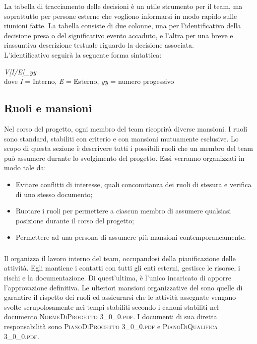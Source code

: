 			La tabella di tracciamento delle decisioni è un utile strumento per il team, ma soprattutto per persone esterne che vogliono informarsi in modo rapido sulle riunioni fatte.
			La tabella consiste di due colonne, una per l'identificativo della decisione presa o del significativo evento accaduto, e l'altra per una breve e riassuntiva descrizione testuale riguardo la decisione associata.\\
			L'identificativo seguirà la seguente forma sintattica:
			\begin{center}
				\textit{V[I/E]\_yy} \\\vspace{0.2cm}dove \textit{I} = Interno, \textit{E} = Esterno, \textit{yy} = numero progessivo
			\end{center}
	
	\newpage	
	\subsection{Ruoli e mansioni}
	Nel corso del progetto, ogni membro del team ricoprirà diverse mansioni. I ruoli sono standard, stabiliti con criterio e con mansioni mutuamente esclusive. Lo scopo di questa sezione è descrivere tutti i possibili ruoli che un membro del team può assumere durante lo svolgimento del progetto. Essi verranno organizzati in modo tale da:
	\begin{itemize}
		\item Evitare conflitti di interesse, quali concomitanza dei ruoli di stesura e verifica di uno stesso documento;
		\item Ruotare i ruoli per permettere a ciascun membro di assumere qualsiasi posizione durante il corso del progetto;
		\item Permettere ad una persona di assumere più mansioni contemporaneamente.
	\end{itemize}

		\subsubsection{\RdP}
		Il \textit{\RdP} organizza il lavoro interno del team, occupandosi della pianificazione delle attività. Egli mantiene i contatti con tutti gli enti esterni, gestisce le risorse, i rischi e la documentazione. Di quest'ultima, è l'unico incaricato di apporre l'approvazione definitiva. Le ulteriori mansioni organizzative del \textit{\RdP} sono quelle di garantire il rispetto dei ruoli ed assicurarsi che le attività assegnate vengano svolte scrupolosamente nei tempi stabiliti secondo i canoni stabiliti nel documento \textsc{NormeDiProgetto 3\_0\_0.pdf}. I documenti di sua diretta responsabilità sono \textsc{PianoDiProgetto 3\_0\_0.pdf} e \textsc{PianoDiQualifica 3\_0\_0.pdf}.

